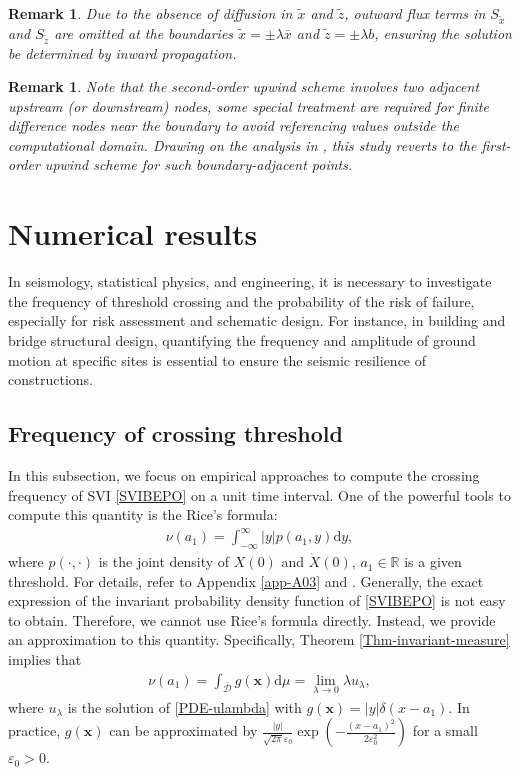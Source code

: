 \documentclass[12pt]{article}
\numberwithin{equation}{section}
\newtheorem{remark}[theorem]{Remark}
\def \R{\mathbb R}
\newcommand{\D}{\mathcal{D}}
\def\d{\mathrm{d}}
\begin{document}
\begin{remark}
	Due to the absence of diffusion in $\tilde{x}$ and $\tilde{z}$, 
	outward flux terms in $S_{\tilde{x}}$ and $S_{\tilde{z}}$ are omitted at the boundaries 
	$\tilde{x} = \pm \lambda\bar{x}$ and $\tilde{z} = \pm \lambda b$, 
	ensuring the solution be determined by inward propagation. 
\end{remark}
\begin{remark}
	Note that the second-order upwind scheme involves two adjacent upstream (or downstream) nodes, 
	some special treatment are required for finite difference nodes near the boundary to 
	avoid referencing values outside the computational domain. 
	Drawing on the analysis in \cite{vanka1987second,qiu2023global}, 
	this study reverts to the first-order upwind scheme for such boundary-adjacent points.  
\end{remark}


\section{Numerical results} \label{sec:num-results}
In seismology, statistical physics, and engineering, 
it is necessary to investigate the frequency of threshold crossing and the probability of the risk of failure, 
especially for risk assessment and schematic design.  
For instance,  in building and bridge structural design, 
quantifying the frequency and amplitude of ground motion 
at specific sites is essential to ensure the seismic resilience of constructions. 
﻿
\subsection{Frequency of crossing threshold}
In this subsection, 
we focus on empirical approaches to compute the crossing frequency of SVI \eqref{SVIBEPO} on a unit time interval. 
One of the powerful tools to compute this quantity is the Rice's formula:
\begin{align*}
	\nu(a_{1}) = \int_{-\infty}^{\infty} |y| p(a_{1},y)\d y, 
\end{align*}
where $p(\cdot,\cdot)$ is the joint density of $X(0)$ and $\dot{X}(0)$, 
$a_{1}\in\R$ is a given threshold. 
For details, refer to Appendix \ref{app-A03} and \cite{LLR83}.  
Generally, the exact expression of the invariant probability density function of  \eqref{SVIBEPO} is not easy to obtain.    
Therefore, we cannot use Rice's formula directly.   
Instead, we provide an approximation to this quantity. 
Specifically,  
Theorem \ref{Thm-invariant-measure} implies that 
\begin{align*}
	\nu(a_{1}) = \int_{\bar{\D}} g(\mathbf{x}) \d \mu
	=\lim_{\lambda\rightarrow0}\lambda u_{\lambda},
\end{align*}
where $u_{\lambda}$ is the solution of \eqref{PDE-ulambda} with $g(\mathbf{x}) = |y|\delta(x-a_{1})$. 
In practice, $g(\mathbf{x})$ can be approximated by
$\frac{|y|}{\sqrt{2\pi}\varepsilon_{0}}\exp\left(-\frac{(x-a_{1})^{2}}{2\varepsilon_{0}^{2}}\right)$ 
for a small $\varepsilon_{0} > 0$. 
\end{document}
